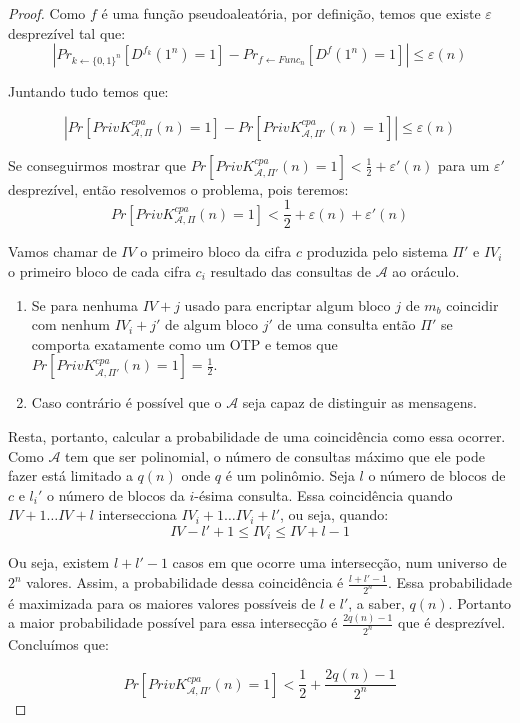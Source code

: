 \begin{proof}
Como $f$ é uma função pseudoaleatória, por definição, temos que existe $\varepsilon$ desprezível tal que:
\begin{displaymath}
  |Pr_{k \leftarrow \{0,1\}^n}[D^{f_k}(1^n) = 1] - Pr_{f \leftarrow Func_n}[D^{f}(1^n) = 1]| \leq \varepsilon(n)
\end{displaymath}

Juntando tudo temos que:

\begin{displaymath}
  |Pr[PrivK^{cpa}_{\mathcal{A},\Pi}(n) = 1] - Pr[PrivK^{cpa}_{\mathcal{A},\Pi'}(n) = 1]| \leq \varepsilon(n)
\end{displaymath}

Se conseguirmos mostrar que $Pr[PrivK^{cpa}_{\mathcal{A},\Pi'}(n) = 1] < \frac{1}{2} + \varepsilon'(n)$ para um $\varepsilon'$ desprezível, então resolvemos o problema, pois teremos:
\begin{displaymath}
  Pr[PrivK^{cpa}_{\mathcal{A},\Pi}(n) = 1] < \frac{1}{2} + \varepsilon(n) + \varepsilon'(n)
\end{displaymath}

Vamos chamar de $IV$ o primeiro bloco da cifra $c$ produzida pelo sistema $\Pi'$ e $IV_i$ o primeiro bloco de cada cifra $c_i$ resultado das consultas de $\mathcal{A}$ ao oráculo.
\begin{enumerate}
\item Se para nenhuma $IV + j$ usado para encriptar algum bloco $j$ de $m_b$ coincidir com nenhum $IV_i + j'$ de algum bloco $j'$ de uma consulta então $\Pi'$ se comporta exatamente como um OTP e temos que $Pr[PrivK^{cpa}_{\mathcal{A},\Pi'}(n) = 1] = \frac{1}{2}$.
\item Caso contrário é possível que o $\mathcal{A}$ seja capaz de distinguir as mensagens.
\end{enumerate}

Resta, portanto, calcular a probabilidade de uma coincidência como essa ocorrer.
Como $\mathcal{A}$ tem que ser polinomial, o número de consultas máximo que ele pode fazer está limitado a $q(n)$ onde $q$ é um polinômio.
Seja $l$ o número de blocos de $c$ e $l_i'$ o número de blocos da $i$-ésima consulta.
Essa coincidência quando $IV + 1 \dots IV + l$ intersecciona $IV_i + 1 \dots IV_i + l'$, ou seja, quando:
\begin{displaymath}
  IV - l' + 1 \leq IV_i \leq IV + l -1
\end{displaymath}

Ou seja, existem $l + l' - 1$ casos em que ocorre uma intersecção, num universo de $2^n$ valores.
Assim, a probabilidade dessa coincidência é $\frac{l + l' -1}{2^n}$.
Essa probabilidade é maximizada para os maiores valores possíveis de $l$ e $l'$, a saber, $q(n)$.
Portanto a maior probabilidade possível para essa intersecção é $\frac{2q(n) - 1}{2^n}$ que é desprezível.
Concluímos que:

\begin{displaymath}
Pr[PrivK^{cpa}_{\mathcal{A},\Pi'}(n) = 1] < \frac{1}{2} + \frac{2q(n) - 1}{2^n}
\end{displaymath}
\end{proof}

